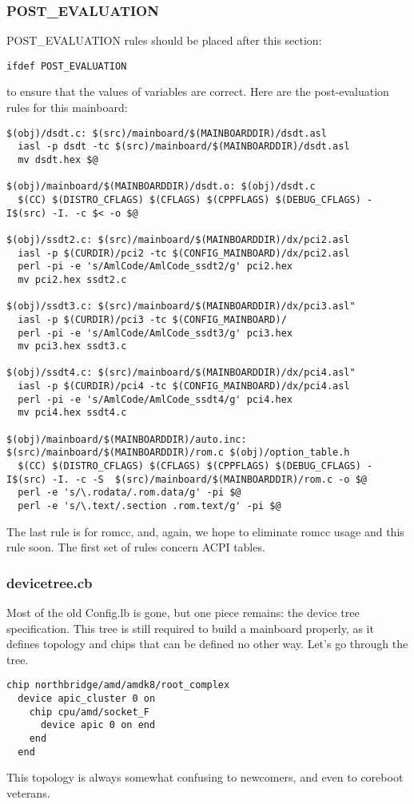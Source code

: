\documentclass[10pt,letterpaper]{article}
\begin{document}
\subsubsection{POST\_EVALUATION}
POST\_EVALUATION rules should be placed after this section:
\begin{verbatim}
ifdef POST_EVALUATION
\end{verbatim}
to ensure that the values of variables are correct.
Here are the post-evaluation rules for this mainboard:
\begin{verbatim}
$(obj)/dsdt.c: $(src)/mainboard/$(MAINBOARDDIR)/dsdt.asl
  iasl -p dsdt -tc $(src)/mainboard/$(MAINBOARDDIR)/dsdt.asl
  mv dsdt.hex $@

$(obj)/mainboard/$(MAINBOARDDIR)/dsdt.o: $(obj)/dsdt.c
  $(CC) $(DISTRO_CFLAGS) $(CFLAGS) $(CPPFLAGS) $(DEBUG_CFLAGS) -I$(src) -I. -c $< -o $@

$(obj)/ssdt2.c: $(src)/mainboard/$(MAINBOARDDIR)/dx/pci2.asl
  iasl -p $(CURDIR)/pci2 -tc $(CONFIG_MAINBOARD)/dx/pci2.asl
  perl -pi -e 's/AmlCode/AmlCode_ssdt2/g' pci2.hex
  mv pci2.hex ssdt2.c

$(obj)/ssdt3.c: $(src)/mainboard/$(MAINBOARDDIR)/dx/pci3.asl"
  iasl -p $(CURDIR)/pci3 -tc $(CONFIG_MAINBOARD)/
  perl -pi -e 's/AmlCode/AmlCode_ssdt3/g' pci3.hex
  mv pci3.hex ssdt3.c
  
$(obj)/ssdt4.c: $(src)/mainboard/$(MAINBOARDDIR)/dx/pci4.asl"
  iasl -p $(CURDIR)/pci4 -tc $(CONFIG_MAINBOARD)/dx/pci4.asl
  perl -pi -e 's/AmlCode/AmlCode_ssdt4/g' pci4.hex
  mv pci4.hex ssdt4.c

$(obj)/mainboard/$(MAINBOARDDIR)/auto.inc: $(src)/mainboard/$(MAINBOARDDIR)/rom.c $(obj)/option_table.h
  $(CC) $(DISTRO_CFLAGS) $(CFLAGS) $(CPPFLAGS) $(DEBUG_CFLAGS) -I$(src) -I. -c -S  $(src)/mainboard/$(MAINBOARDDIR)/rom.c -o $@
  perl -e 's/\.rodata/.rom.data/g' -pi $@
  perl -e 's/\.text/.section .rom.text/g' -pi $@

\end{verbatim}
The last rule is for romcc, and, again, we hope to eliminate romcc usage and this rule soon. The first set of rules concern ACPI tables.
\subsubsection{devicetree.cb}
Most of the old Config.lb is gone, but one piece remains: the device tree specification. This tree is still required to build a mainboard
properly, as it defines topology and chips that can be defined no other way.
Let's go through the tree.
\begin{verbatim}
chip northbridge/amd/amdk8/root_complex
  device apic_cluster 0 on
    chip cpu/amd/socket_F
      device apic 0 on end
    end
  end
\end{verbatim}
This topology is always somewhat confusing to newcomers, and even to coreboot veterans.
\end{document}
